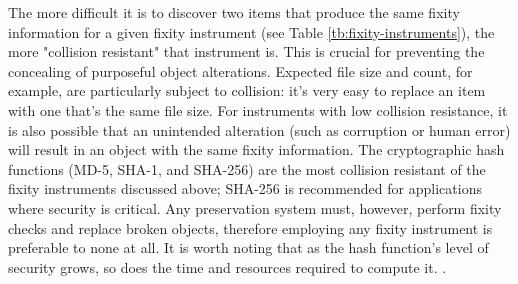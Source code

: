 The more difficult it is to discover two items that produce the same fixity information for a given fixity instrument (see Table \ref{tb:fixity-instruments}), the more "collision resistant" that instrument is. This is crucial for preventing the concealing of purposeful object alterations. Expected file size and count, for example, are particularly subject to collision: it's very easy to replace an item with one that's the same file size. For instruments with low collision resistance, it is also possible that an unintended alteration (such as corruption or human error) will result in an object with the same fixity information. The cryptographic hash functions (MD-5, SHA-1, and SHA-256) are the most collision resistant of the fixity instruments discussed above; SHA-256 is recommended for applications where security is critical. Any preservation system must, however, perform fixity checks and replace broken objects, therefore employing any fixity instrument is preferable to none at all. It is worth noting that as the hash function's level of security grows, so does the time and resources required to compute it. \cite[6]{ndsa2014fixity}.

